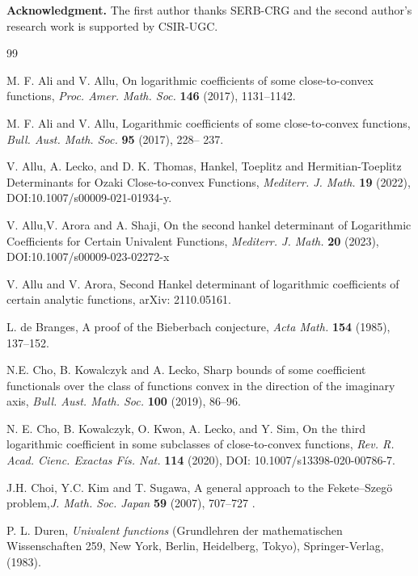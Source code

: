 \documentclass[a4paper,12pt]{amsart}
\theoremstyle{definition}
\numberwithin{equation}{section}
\begin{document}
{\bf Acknowledgment.}
The first author thanks SERB-CRG and the second author's research work is supported by CSIR-UGC.
\begin{thebibliography}{99}
	
	{\sc M. F. Ali} and {\sc V. Allu}, On logarithmic coefficients of some close-to-convex functions, {\it Proc. Amer. Math. Soc.} {\bf 146} (2017), 1131--1142.
	
	
	{\sc M. F. Ali} and {\sc V. Allu}, Logarithmic coefficients of some close-to-convex functions, {\it Bull. Aust. Math. Soc.} {\bf 95} (2017), 228-- 237.
	
	{\sc V. Allu, A. Lecko,} and {\sc D. K. Thomas}, {Hankel, Toeplitz and Hermitian-Toeplitz Determinants for Ozaki Close-to-convex Functions}, {\em  Mediterr. J. Math.} {\bf 19} (2022), DOI:10.1007/s00009-021-01934-y.	
	
	{\sc V. Allu},{\sc V. Arora} and {\sc A. Shaji}, On the second hankel determinant of Logarithmic Coefficients for Certain Univalent Functions, {\it Mediterr. J. Math.} {\bf 20} (2023), DOI:10.1007/s00009-023-02272-x	
	
	{\sc V. Allu} and {\sc V. Arora}, Second Hankel determinant of logarithmic coefficients of certain analytic functions,
	arXiv: 2110.05161.
	
	
	{\sc L. de Branges}, {A proof of the Bieberbach conjecture}, {\em Acta  Math.} \textbf{154} (1985), 137--152.
	
	{\sc N.E. Cho}, {\sc B. Kowalczyk} and {\sc A. Lecko}, Sharp bounds of some coefficient functionals over the class of functions convex in the direction of the imaginary axis, {\it Bull. Aust. Math. Soc.} {\bf 100} (2019), 86--96.
	
	
	{\sc N. E. Cho}, {\sc B. Kowalczyk}, {\sc O. Kwon}, {\sc A. Lecko},  and {\sc Y. Sim}, On the third logarithmic coefficient in some subclasses of close-to-convex functions, {\it Rev. R. Acad. Cienc. Exactas Fís. Nat.} {\bf 114} (2020), DOI: 10.1007/s13398-020-00786-7.
	
	{\sc J.H. Choi}, {\sc Y.C. Kim} and {\sc T. Sugawa}, A general approach to the Fekete–Szegö problem,{\it J. Math. Soc. Japan} {\bf 59} (2007), 707--727 .
	
	{\sc P. L. Duren}, {\it Univalent functions} (Grundlehren der mathematischen Wissenschaften 259, New York, Berlin, Heidelberg, Tokyo),
	Springer-Verlag, (1983).
	

\end{thebibliography}
\end{document}
